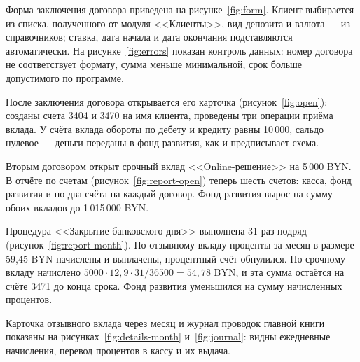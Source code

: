\documentclass[14pt,a4paper]{extarticle}
\begin{document}
Форма заключения договора приведена на рисунке~\ref{fig:form}. Клиент выбирается из
списка, полученного от модуля <<Клиенты>>, вид депозита и валюта --- из справочников;
ставка, дата начала и дата окончания подставляются автоматически. На
рисунке~\ref{fig:errors} показан контроль данных: номер договора не соответствует формату,
сумма меньше минимальной, срок больше допустимого по программе.



После заключения договора открывается его карточка (рисунок~\ref{fig:open}): созданы
счета 3404 и 3470 на имя клиента, проведены три операции приёма вклада. У счёта вклада
обороты по дебету и кредиту равны 10\,000, сальдо нулевое --- деньги переданы в фонд
развития, как и предписывает схема.


Вторым договором открыт срочный вклад <<Online-решение>> на 5\,000 BYN. В отчёте по
счетам (рисунок~\ref{fig:report-open}) теперь шесть счетов: касса, фонд развития и по два
счёта на каждый договор. Фонд развития вырос на сумму обоих вкладов до 1\,015\,000 BYN.


Процедура <<Закрытие банковского дня>> выполнена 31 раз подряд
(рисунок~\ref{fig:report-month}). По отзывному вкладу проценты за месяц в размере 59,45 BYN
начислены и выплачены, процентный счёт обнулился. По срочному вкладу начислено
$5000 \cdot 12{,}9 \cdot 31 / 36500 = 54{,}78$ BYN, и эта сумма остаётся на счёте 3471 до
конца срока. Фонд развития уменьшился на сумму начисленных процентов.


Карточка отзывного вклада через месяц и журнал проводок главной книги показаны на
рисунках~\ref{fig:details-month} и~\ref{fig:journal}: видны ежедневные начисления, перевод
процентов в кассу и их выдача.


\end{document}
